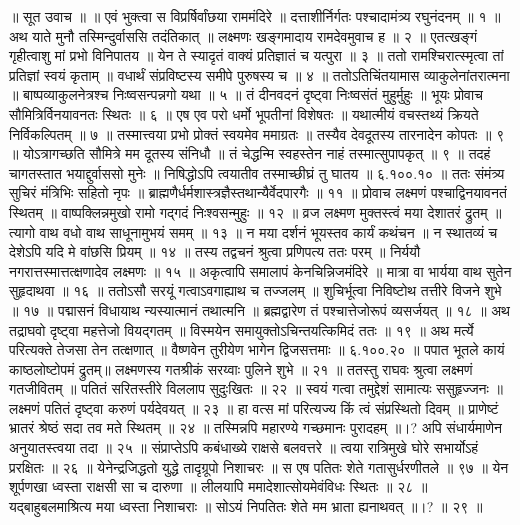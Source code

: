 ॥ सूत उवाच ॥ ॥
एवं भुक्त्वा स विप्रर्षिर्वांछया राममंदिरे ॥
दत्ताशीर्निर्गतः पश्चादामंत्र्य रघुनंदनम् ॥ १ ॥
अथ याते मुनौ तस्मिन्दुर्वाससि तदंतिकात् ॥
लक्ष्मणः खङ्गमादाय रामदेवमुवाच ह ॥ २ ॥
एतत्खङ्गं गृहीत्वाशु मां प्रभो विनिपातय ॥
येन ते स्यादृतं वाक्यं प्रतिज्ञातं च यत्पुरा ॥ ३ ॥
ततो रामश्चिरात्स्मृत्वा तां प्रतिज्ञां स्वयं कृताम् ॥
वधार्थं संप्रविष्टस्य समीपे पुरुषस्य च ॥ ४ ॥
ततोऽतिचिंतयामास व्याकुलेनांतरात्मना ॥
बाष्पव्याकुलनेत्रश्च निःष्वसन्पन्नगो यथा ॥ ५ ॥
तं दीनवदनं दृष्ट्वा निःष्वसंतं मुहुर्मुहुः ॥
भूयः प्रोवाच सौमित्रिर्विनयावनतः स्थितः ॥ ६ ॥
एष एव परो धर्मो भूपतीनां विशेषतः ॥
यथात्मीयं वचस्तथ्यं क्रियते निर्विकल्पितम् ॥ ७ ॥
तस्मात्त्वया प्रभो प्रोक्तं स्वयमेव ममाग्रतः ॥
तस्यैव देवदूतस्य तारनादेन कोपतः ॥ ९ ॥
योऽत्रागच्छति सौमित्रे मम दूतस्य संनिधौ ॥
तं चेद्धन्मि स्वहस्तेन नाहं तस्मात्सुपापकृत् ॥ ९ ॥
तदहं चागतस्तात भयाद्दुर्वाससो मुनेः ॥
निषिद्धोऽपि त्वयातीव तस्माच्छीघ्रं तु घातय ॥ ६.१००.१० ॥
ततः संमंत्र्य सुचिरं मंत्रिभिः सहितो नृपः ॥
ब्राह्मणैर्धर्मशास्त्रज्ञैस्तथान्यैर्वेदपारगैः ॥ ११ ॥
प्रोवाच लक्ष्मणं पश्चाद्विनयावनतं स्थितम् ॥
वाष्पक्लिन्नमुखो रामो गद्गदं निःश्वसन्मुहुः ॥ १२ ॥
व्रज लक्ष्मण मुक्तस्त्वं मया देशातरं द्रुतम् ॥
त्यागो वाथ वधो वाथ साधूनामुभयं समम् ॥ १३ ॥
न मया दर्शनं भूयस्तव कार्यं कथंचन ॥
न स्थातव्यं च देशेऽपि यदि मे वांछसि प्रियम् ॥ १४ ॥
तस्य तद्वचनं श्रुत्वा प्रणिपत्य ततः परम् ॥
निर्ययौ नगरात्तस्मात्तत्क्षणादेव लक्ष्मणः ॥ १५ ॥
अकृत्वापि समालापं केनचिन्निजमंदिरे ॥
मात्रा वा भार्यया वाथ सुतेन सुहृदाथवा ॥ १६ ॥
ततोऽसौ सरयूं गत्वाऽवगाह्याथ च तज्जलम् ॥
शुचिर्भूत्वा निविष्टोथ तत्तीरे विजने शुभे ॥ १७ ॥
पद्मासनं विधायाथ न्यस्यात्मानं तथात्मनि ॥
ब्रह्मद्वारेण तं पश्चात्तेजोरूपं व्यसर्जयत् ॥ १८ ॥
अथ तद्राघवो दृष्ट्वा महत्तेजो वियद्गतम् ॥
विस्मयेन समायुक्तोऽचिन्तयत्किमिदं ततः ॥ १९ ॥
अथ मर्त्ये परित्यक्ते तेजसा तेन तत्क्षणात् ॥
वैष्णवेन तुरीयेण भागेन द्विजसत्तमाः ॥ ६.१००.२० ॥
पपात भूतले कायं काष्ठलोष्टोपमं द्रुतम्॥
लक्ष्मणस्य गतश्रीकं सरय्वाः पुलिने शुभे ॥ २१ ॥
ततस्तु राघवः श्रुत्वा लक्ष्मणं गतजीवितम् ॥
पतितं सरितस्तीरे विललाप सुदुःखितः ॥ २२ ॥
स्वयं गत्वा तमुद्देशं सामात्यः ससुहृज्जनः ॥
लक्ष्मणं पतितं दृष्ट्वा करुणं पर्यदेवयत् ॥ २३ ॥
हा वत्स मां परित्यज्य किं त्वं संप्रस्थितो दिवम् ॥
प्राणेष्टं भ्रातरं श्रेष्ठं सदा तव मते स्थितम् ॥ २४ ॥
तस्मिन्नपि महारण्ये गच्छमानः पुरादहम् ॥।?
अपि संधार्यमाणेन अनुयातस्त्वया तदा ॥ २५ ॥
संप्राप्तेऽपि कबंधाख्ये राक्षसे बलवत्तरे ॥
त्वया रात्रिमुखे घोरे सभार्योऽहं प्ररक्षितः ॥ २६ ॥
येनेन्द्रजिद्धतो युद्धे तादृग्रूपो निशाचरः ॥
स एष पतितः शेते गतासुर्धरणीतले ॥ ९७ ॥
येन शूर्पणखा ध्वस्ता राक्षसी सा च दारुणा ॥
लीलयापि ममादेशात्सोयमेवंविधः स्थितः ॥ २८ ॥
यद्बाहुबलमाश्रित्य मया ध्वस्ता निशाचराः ॥
सोऽयं निपतितः शेते मम भ्राता ह्यनाथवत् ॥।? ॥ २९ ॥
